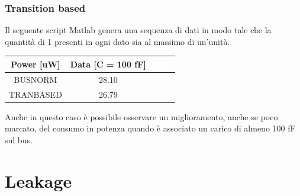 \documentclass[11pt,  english, makeidx, a4paper, titlepage, oneside]{book}
\newenvironment{listato}{\footnotesize} {\normalsize }
\begin{document}
\subsection{Transition based}
Il seguente script Matlab genera una sequenza di dati in modo tale che la quantità di 1 presenti in ogni dato sia al massimo di un'unità.
\begin{center}
\begin{listato}
	\centerline{}
\end{listato}
\end{center}
\vspace{0.3cm}
\begin{center}
	\begin{tabular}{|c|c|c|c|c|}
	\hline
	Power [uW] & Data [C = 100 fF]\\
	\hline
	BUSNORM & 28.10\\
	 \hline
	TRANBASED & 26.79\\
	\hline
	\end{tabular}	
\end{center}
\vspace{0.3cm}
Anche in questo caso è possibile osservare un miglioramento, anche se poco marcato, del consumo in potenza quando è associato un carico di almeno 100 fF sul bus.
\chapter{Leakage}
\end{document}
